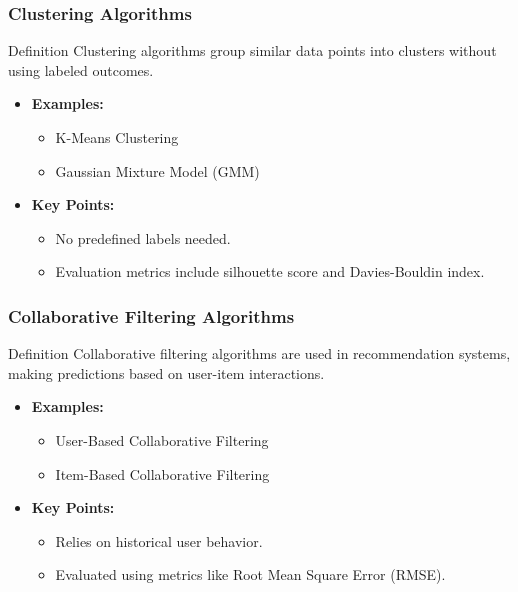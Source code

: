 \documentclass[aspectratio=169]{beamer}
\begin{document}
\begin{frame}[fragile]
    \frametitle{Clustering Algorithms}

    \begin{block}{Definition}
        Clustering algorithms group similar data points into clusters without using labeled outcomes.
    \end{block}

    \begin{itemize}
        \item \textbf{Examples:}
            \begin{itemize}
                \item K-Means Clustering
                \item Gaussian Mixture Model (GMM)
            \end{itemize}
        
        \item \textbf{Key Points:}
            \begin{itemize}
                \item No predefined labels needed.
                \item Evaluation metrics include silhouette score and Davies-Bouldin index.
            \end{itemize}
    \end{itemize}
\end{frame}

\begin{frame}[fragile]
    \frametitle{Collaborative Filtering Algorithms}

    \begin{block}{Definition}
        Collaborative filtering algorithms are used in recommendation systems, making predictions based on user-item interactions.
    \end{block}

    \begin{itemize}
        \item \textbf{Examples:}
            \begin{itemize}
                \item User-Based Collaborative Filtering
                \item Item-Based Collaborative Filtering
            \end{itemize}
        
        \item \textbf{Key Points:}
            \begin{itemize}
                \item Relies on historical user behavior.
                \item Evaluated using metrics like Root Mean Square Error (RMSE).
            \end{itemize}
    \end{itemize}
\end{frame}
\end{document}
